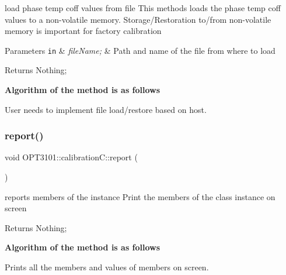 load phase temp coff values from file This methods loads the phase temp coff values to a non-\/volatile memory. Storage/\+Restoration to/from non-\/volatile memory is important for factory calibration 


\begin{DoxyParams}[1]{Parameters}
\mbox{\tt in}  & {\em file\+Name;} & Path and name of the file from where to load \\
\hline
\end{DoxyParams}
\begin{DoxyReturn}{Returns}
Nothing; 
\end{DoxyReturn}
{\bfseries Algorithm of the method is as follows}


\begin{DoxyItemize}
\item User needs to implement file load/restore based on host. 
\end{DoxyItemize}\mbox{\label{class_o_p_t3101_1_1calibration_c_a092218b4999bced567ec60d147e66caa}} 
\subsubsection{\texorpdfstring{report()}{report()}}
{\footnotesize\ttfamily void O\+P\+T3101\+::calibration\+C\+::report (\begin{DoxyParamCaption}{ }\end{DoxyParamCaption})}



reports members of the instance Print the members of the class instance on screen 

\begin{DoxyReturn}{Returns}
Nothing; 
\end{DoxyReturn}
{\bfseries Algorithm of the method is as follows}


\begin{DoxyItemize}
\item Prints all the members and values of members on screen. 
\end{DoxyItemize}\mbox{\label{class_o_p_t3101_1_1calibration_c_a3a8c57f480444c89fc855f7c90d4d81c}} 
